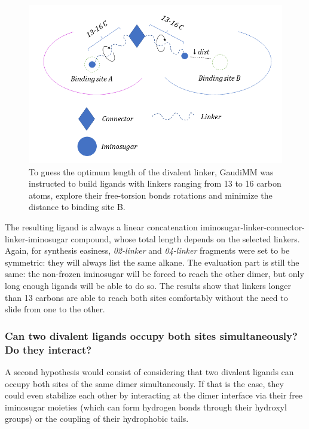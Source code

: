 \begin{figure}[H] %
	\begin{Center}
		\includegraphics[width=\textwidth]{./figures/06/divalent-fragments-stretch.png}
	\end{Center}
	\caption[Di-ONJ linker length optimization]{To guess the optimum length of the divalent linker, GaudiMM was instructed to build ligands with linkers ranging from 13 to 16 carbon atoms, explore their free-torsion bonds rotations and minimize the distance to binding site B.}
	\label{fig:divalent-length}
\end{figure}

The resulting ligand is always a linear concatenation iminosugar-linker-connector-linker-iminosugar compound, whose total length depends on the selected linkers. Again, for synthesis easiness, \textit{02-linker} and \textit{04-linker} fragments were set to be symmetric: they will always list the same alkane. The evaluation part is still the same: the non-frozen iminosugar will be forced to reach the other dimer, but only long enough ligands will be able to do so. The results show that linkers longer than 13 carbons are able to reach both sites comfortably without the need to slide from one to the other.

\subsubsection{Can two divalent ligands occupy both sites simultaneously? Do they interact?}
A second hypothesis would consist of considering that two divalent ligands can occupy both sites of the same dimer simultaneously. If that is the case, they could even stabilize each other by interacting at the dimer interface via their free iminosugar moieties (which can form hydrogen bonds through their hydroxyl groups) or the coupling of their hydrophobic tails.

